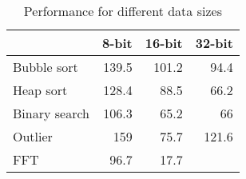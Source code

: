 
\begin{table}[]
\centering
\caption{Performance for different data sizes}
\label{tbl-performance-8-16-32-bit}
\begin{tabular}{lrrr}
\toprule
               &   8-bit  &  16-bit  &     32-bit \\
\midrule
Bubble sort    &    139.5 &    101.2 &       94.4 \\
Heap sort      &    128.4 &     88.5 &       66.2 \\
Binary search  &    106.3 &     65.2 &         66 \\
Outlier        &      159 &     75.7 &      121.6 \\
FFT            &     96.7 &     17.7 &            \\
\bottomrule
\end{tabular}
\end{table}
